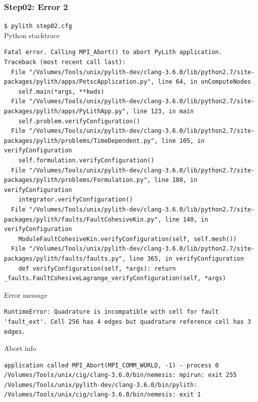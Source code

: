 \documentclass[aspectration=169]{beamer}
\newcommand{\cmd}[1]{{\footnotesize\tt \color{ltred}#1}}
\newcommand{\errlabel}[1]{{\small \color{blue}#1}}
\begin{document}
\begin{frame}[fragile]
  \frametitle{Step02: Error 2}

\cmd{\$ pylith step02.cfg}\\
\errlabel{Python stacktrace}
\begin{lstlisting}
Fatal error. Calling MPI_Abort() to abort PyLith application.
Traceback (most recent call last):
  File "/Volumes/Tools/unix/pylith-dev/clang-3.6.0/lib/python2.7/site-packages/pylith/apps/PetscApplication.py", line 64, in onComputeNodes
    self.main(*args, **kwds)
  File "/Volumes/Tools/unix/pylith-dev/clang-3.6.0/lib/python2.7/site-packages/pylith/apps/PyLithApp.py", line 123, in main
    self.problem.verifyConfiguration()
  File "/Volumes/Tools/unix/pylith-dev/clang-3.6.0/lib/python2.7/site-packages/pylith/problems/TimeDependent.py", line 105, in verifyConfiguration
    self.formulation.verifyConfiguration()
  File "/Volumes/Tools/unix/pylith-dev/clang-3.6.0/lib/python2.7/site-packages/pylith/problems/Formulation.py", line 180, in verifyConfiguration
    integrator.verifyConfiguration()
  File "/Volumes/Tools/unix/pylith-dev/clang-3.6.0/lib/python2.7/site-packages/pylith/faults/FaultCohesiveKin.py", line 140, in verifyConfiguration
    ModuleFaultCohesiveKin.verifyConfiguration(self, self.mesh())
  File "/Volumes/Tools/unix/pylith-dev/clang-3.6.0/lib/python2.7/site-packages/pylith/faults/faults.py", line 365, in verifyConfiguration
    def verifyConfiguration(self, *args): return _faults.FaultCohesiveLagrange_verifyConfiguration(self, *args)
\end{lstlisting}
\errlabel{Error message}
\begin{lstlisting}
RuntimeError: Quadrature is incompatible with cell for fault 'fault_ext'. Cell 256 has 4 edges but quadrature reference cell has 3 edges.
\end{lstlisting}
\errlabel{Abort info}
\begin{lstlisting}
application called MPI_Abort(MPI_COMM_WORLD, -1) - process 0
/Volumes/Tools/unix/cig/clang-3.6.0/bin/nemesis: mpirun: exit 255
/Volumes/Tools/unix/pylith-dev/clang-3.6.0/bin/pylith: /Volumes/Tools/unix/cig/clang-3.6.0/bin/nemesis: exit 1
\end{lstlisting}
  
\end{frame}
\end{document}
